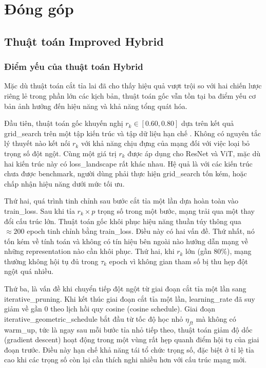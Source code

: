 \chapter{Đóng góp}
    \section{Thuật toán Improved Hybrid}
        \subsection{Điểm yếu của thuật toán Hybrid}
            Mặc dù thuật toán cắt tỉa lai đã cho thấy hiệu quả vượt trội so với hai chiến lược riêng lẻ trong phần lớn các kịch bản, thuật toán gốc vẫn tồn tại ba điểm yếu cơ bản ảnh hưởng đến hiệu năng và khả năng tổng quát hóa.
    
            Đầu tiên, thuật toán gốc khuyến nghị $r_k \in [0.60, 0.80]$ dựa trên kết quả \gls{grid_search} trên một tập kiến trúc và tập dữ liệu hạn chế \cite[Sec~.5.5]{hybrid}. Không có nguyên tắc lý thuyết nào kết nối $r_k$ với khả năng chịu đựng của mạng đối với việc loại bỏ trọng số đột ngột. Cùng một giá trị $r_k$ được áp dụng cho ResNet và ViT, mặc dù hai kiến trúc này có \gls{loss_landscape} rất khác nhau. Hệ quả là với các kiến trúc chưa được \gls{benchmark}, người dùng phải thực hiện \gls{grid_search} tốn kém, hoặc chấp nhận hiệu năng dưới mức tối ưu.
    
            Thứ hai, quá trình tinh chỉnh sau bước cắt tỉa một lần dựa hoàn toàn vào \gls{train_loss}. Sau khi tỉa $r_k \times p$ trọng số trong một bước, mạng trải qua một thay đổi cấu trúc lớn. Thuật toán gốc khôi phục hiệu năng thuần túy thông qua $\approx 200$ epoch tinh chỉnh bằng \gls{train_loss}. Điều này có hai vấn đề. Thứ nhất, nó tốn kém về tính toán và không có tín hiệu bên ngoài nào hướng dẫn mạng về những \gls{representation} nào cần khôi phục. Thứ hai, khi $r_k$ lớn (gần 80\%), mạng thường không hội tụ đủ trong $\tau_k$ epoch vì không gian tham số bị thu hẹp đột ngột quá nhiều.
    
            Thứ ba, là vấn đề khi chuyển tiếp đột ngột từ giai đoạn cắt tỉa một lần sang \gls{iterative_pruning}. Khi kết thúc giai đoạn cắt tỉa một lần, \gls{learning_rate} đã suy giảm về gần 0 theo lịch hồi quy cosine (cosine schedule). Giai đoạn \gls{iterative_geometric_schedule} bắt đầu từ tốc độ học nhỏ $\eta_{ft}$ mà không có \gls{warm_up}, tức là ngay sau mỗi bước tỉa nhỏ tiếp theo, thuật toán giảm độ dốc (gradient descent) hoạt động trong một vùng rất hẹp quanh điểm hội tụ của giai đoạn trước. Điều này hạn chế khả năng tái tổ chức trọng số, đặc biệt ở tỉ lệ tỉa cao khi các trọng số còn lại cần thích nghi nhiều hơn với cấu trúc mạng mới.

